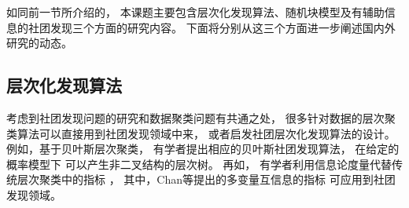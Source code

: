 如同前一节所介绍的， 本课题主要包含层次化发现算法、随机块模型及有辅助信息的社团发现三个方面的研究内容。
下面将分别从这三个方面进一步阐述国内外研究的动态。
\subsection{层次化发现算法}
考虑到社团发现问题的研究和数据聚类问题有共通之处，
很多针对数据的层次聚类算法可以直接用到社团发现领域中来，
或者启发社团层次化发现算法的设计。
例如，基于贝叶斯层次聚类\cite{heller2005bhc}，
有学者提出相应的贝叶斯社团发现算法\cite{blundell2011discovering, blundell2013bhcd}，
在给定的概率模型下
可以产生非二叉结构的层次树。
再如，
有学者利用信息论度量代替传统层次聚类中的指标
\cite{gokcay2002clustering,aghagolzadeh2007hierarchical,chan2016ic}，
其中，Chan等\cite{chan2016ic}提出的多变量互信息的指标
可应用到社团发现领域\cite{chan2017pin}。

